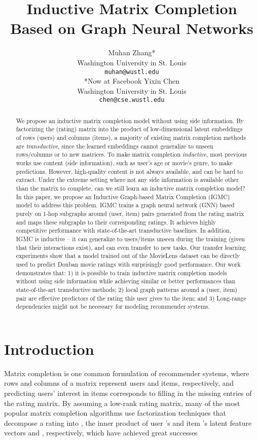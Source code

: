 \documentclass{article} \usepackage{iclr2020_conference,times}
\title{Inductive Matrix Completion Based on Graph Neural Networks}
\author{Muhan Zhang*\\
Washington University in St. Louis\\
\texttt{muhan@wustl.edu}\\
\footnotesize{*Now at Facebook}
\And Yixin Chen\\
Washington University in St. Louis\\
\texttt{chen@cse.wustl.edu} \\
}
\begin{document}
\maketitle

\begin{abstract}
We propose an inductive matrix completion model without using side information. By factorizing the (rating) matrix into the product of low-dimensional latent embeddings of rows (users) and columns (items), a majority of existing matrix completion methods are \textit{transductive}, since the learned embeddings cannot generalize to unseen rows/columns or to new matrices. To make matrix completion \textit{inductive}, most previous works use content (side information), such as user's age or movie's genre, to make predictions. However, high-quality content is not always available, and can be hard to extract. Under the extreme setting where not any side information is available other than the matrix to complete, can we still learn an inductive matrix completion model? In this paper, we propose an Inductive Graph-based Matrix Completion (IGMC) model to address this problem. IGMC trains a graph neural network (GNN) based purely on 1-hop subgraphs around (user, item) pairs generated from the rating matrix and maps these subgraphs to their corresponding ratings. It achieves highly competitive performance with state-of-the-art transductive baselines. In addition, IGMC is inductive -- it can generalize to users/items unseen during the training (given that their interactions exist), and can even transfer to new tasks. Our transfer learning experiments show that a model trained out of the MovieLens dataset can be directly used to predict Douban movie ratings with surprisingly good performance. Our work demonstrates that: 1) it is possible to train inductive matrix completion models without using side information while achieving similar or better performances than state-of-the-art transductive methods; 2) local graph patterns around a (user, item) pair are effective predictors of the rating this user gives to the item; and 3) Long-range dependencies might not be necessary for modeling recommender systems.



\end{abstract}

\section{Introduction}
Matrix completion \citep{candes2009exact} is one common formulation of recommender systems, where rows and columns of a matrix represent users and items, respectively, and predicting users' interest in items corresponds to filling in the missing entries of the rating matrix.
By assuming a low-rank rating matrix, many of the most popular matrix completion algorithms use factorization techniques that decompose a rating  into , the inner product of user 's and item 's latent feature vectors  and , respectively, which have achieved great successes \citep{adomavicius2005toward,schafer2007collaborative,koren2009matrix,bobadilla2013recommender} 
\end{document}
